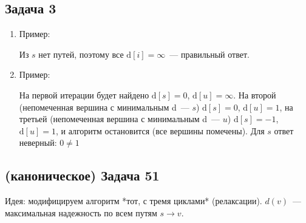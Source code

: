 \documentclass[a4paper]{article}
\begin{document}
\subsection*{Задача 3}
\begin{enumerate}
\item Пример:\newline{}\newline
Из $s$ нет путей, поэтому все $\mbox{d}[i]=\infty$~--- правильный ответ.
\item Пример:\newline
{}
На первой итерации будет найдено $\mbox{d}[s]=0$, $\mbox{d}[u]=\infty$. На второй (непомеченная вершина с минимальным d~--- $s$) $\mbox{d}[s]=0$, $\mbox{d}[u]=1$, на третьей (непомеченная вершина с минимальным d~--- $u$) $\mbox{d}[s]=-1$, $\mbox{d}[u]=1$, и алгоритм остановится (все вершины помечены). Для $s$ ответ неверный: $0\neq 1$
\end{enumerate}
\subsection*{(каноническое) Задача 51}
Идея: модифицируем алгоритм *тот, с тремя циклами* (релаксации). $d(v)$~--- максимальная надежность по всем путям $s\to v$.
\end{document}
